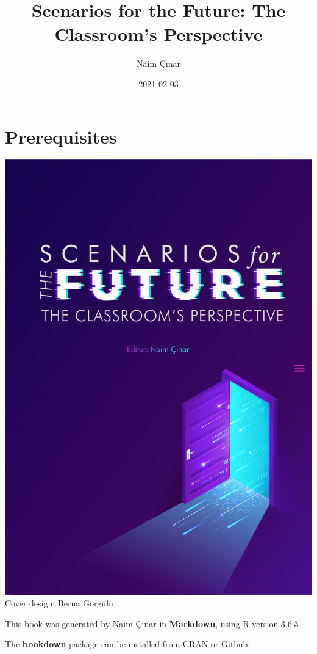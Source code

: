 \documentclass[]{book}
\title{Scenarios for the Future: The Classroom's Perspective}
\author{Naim Çınar}
\date{2021-02-03}
\begin{document}
\maketitle

{
\setcounter{tocdepth}{1}
\tableofcontents
}
\hypertarget{section-id}{%
\chapter*{Prerequisites}\label{section-id}}

\includegraphics{images/book-cover.jpg}
Cover design: Berna Görgülü

This book was generated by Naim Çınar in \textbf{Markdown}, using R version 3.6.3

The \textbf{bookdown} package can be installed from CRAN or Github:
\end{document}
